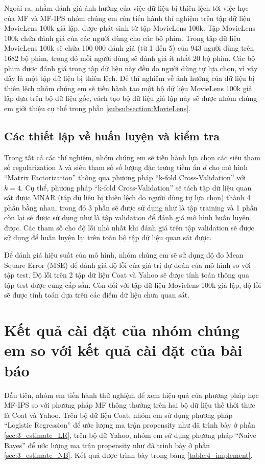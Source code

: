 Ngoài ra, nhằm đánh giá ảnh hưởng của việc dữ liệu bị thiên lệch tới việc học của MF và MF-IPS nhóm chúng em còn tiến hành thí nghiệm trên tập dữ liệu MovieLens 100k giả lập, được phát sinh từ tập MovieLens 100k. Tập MovieLens 100k chứa đánh giá của các người dùng cho các bộ phim. Trong tập dữ liệu MovieLens 100k sẽ chứa 100 000 đánh giá (từ 1 đến 5) của 943 người dùng trên 1682 bộ phim, trong đó mỗi người dùng sẽ đánh giá ít nhất 20 bộ phim. Các bộ phim được đánh giá trong tập dữ liệu này đều do người dùng tự lựa chọn, vì vậy đây là một tập dữ liệu bị thiên lệch. Để thí nghiệm về ảnh hưởng của dữ liệu bị thiên lệch nhóm chúng em sẽ tiến hành tạo một bộ dữ liệu MovieLens 100k giả lập dựa trên bộ dữ liệu gốc, cách tạo bộ dữ liệu giả lập này sẽ được nhóm chúng em giới thiệu cụ thể trong phần \ref{subsubsection:MovieLens}.

\subsection{Các thiết lập về huấn luyện và kiểm tra}
Trong tất cả các thí nghiệm, nhóm chúng em sẽ tiến hành lựa chọn các siêu tham số regularization $\lambda$ và siêu tham số số lượng đặc trưng tiềm ẩn $d$ cho mô hình ``Matrix Factorization'' thông qua phương pháp ``k-fold Cross-Validation'' với $k=4$. Cụ thể, phương pháp ``k-fold Cross-Validation'' sẽ tách tập dữ liệu quan sát được MNAR (tập dữ liệu bị thiên lệch do người dùng tự lựa chọn) thành 4 phần bằng nhau, trong đó 3 phần sẽ được sử dụng như là tập training và 1 phần còn lại sẽ được sử dụng như là tập validation để đánh giá mô hình huấn luyện được. Các tham số cho độ lỗi nhỏ nhất khi đánh giá trên tập validation sẽ được sử dụng để huấn luyện lại trên toàn bộ tập dữ liệu quan sát được. 

Để đánh giá hiệu suất của mô hình, nhóm chúng em sẽ sử dụng độ đo Mean Square Error (MSE) để đánh giá độ lỗi của giá trị dự đoán của mô hình so với tập test. Độ lỗi trên 2 tập dữ liệu Coat và Yahoo sẽ được tính toán thông qua tập test được cung cấp sẵn. Còn đối với tập dữ liệu Movielens 100k giả lập, độ lỗi sẽ được tính toán dựa trên các điểm dữ liệu chưa quan sát.


\section{Kết quả cài đặt của nhóm chúng em so với kết quả cài đặt của bài báo}
Đầu tiên, nhóm em tiến hành thử nghiệm để xem hiệu quả của phương pháp học MF-IPS so với phương pháp MF thông thường trên hai bộ dữ liệu thế thới thực là Coat và Yahoo. Trên bộ dữ liệu Coat, nhóm em sử dụng phương pháp ``Logistic Regression'' để ước lượng ma trận propensity như đã trình bày ở phần \ref{sec:3_estimate_LR}, trên bộ dữ Yahoo, nhóm em sử dụng phương pháp ``Naive Bayes'' để ước lượng ma trận propensity như đã trình bày ở phần \ref{sec:3_estimate_NB}. Kết quả được trình bày trong bảng \ref{table:4_implement}.

